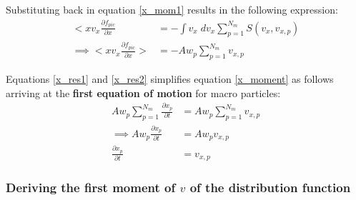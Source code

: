 \documentclass{article}
\begin{document}
Substituting back in equation \ref{x_mom1} results in the following expression:
\begin{align}
<xv_{x}\frac{\partial f_{pic}}{\partial x} &=-\int v_{x}\;dv_{x} \sum_{p=1}^{N_{m}}S(v_{x},v_{x,p}) \\
\implies <xv_{x} \frac{\partial f_{pic}}{\partial x}> &= - Aw_{p}\sum_{p=1}^{N_{m}} v_{x,p} \label{x_res2}
\end{align}

Equations \ref{x_res1} and \ref{x_res2} simplifies equation \ref{x_moment} as follows arriving at the \textbf{first equation of motion} for macro particles:
\begin{align}
Aw_{p}\sum_{p=1}^{N_{m}}\frac{\partial x_{p}}{\partial t} &= Aw_{p}\sum_{p=1}^{N_{m}} v_{x,p} \\
\implies Aw_{p}\frac{\partial x_{p}}{\partial t} &= Aw_{p} v_{x,p} \\
\frac{\partial x_{p}}{\partial t} &= v_{x,p}
\end{align}

\subsubsection*{Deriving the first moment of $v$ of the distribution function}
\end{document}
